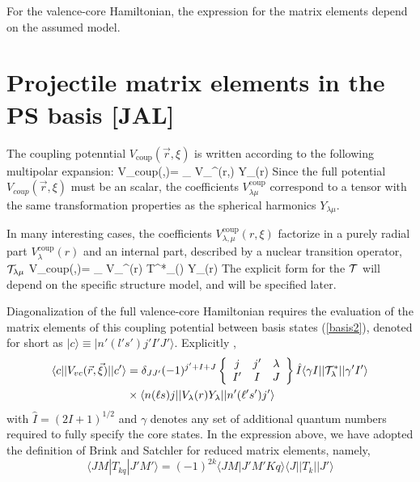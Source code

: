 \documentclass[preprint,12pt]{elsarticle}
\begin{document}
For the valence-core Hamiltonian, the expression for the matrix elements depend on the assumed model.

\section{Projectile matrix elements in the PS basis [JAL]}
The coupling potenntial $V_\mathrm{coup}(\vec{r},\xi)$ 
is written according to the following multipolar expansion:
\be
V_{coup}(,\xi)= \sum_{\lambda } V_{\lambda \mu}^(r,\xi) Y_{\lambda \mu }(\hat r)
\label{vcoup1}
\ee
Since the full potential $V_{coup}(\vec{r},\xi)$ must be an scalar, the coefficients  $V_{\lambda \mu}^\mathrm{coup}$ correspond to a tensor 
with the same transformation properties as the spherical harmonics $Y_{\lambda \mu }$.

In many interesting cases, the coefficients $V_{\lambda,\mu}^\mathrm{coup}(r,\xi)$  factorize in a purely radial part $V^\mathrm{coup}_{\lambda}(r)$ and an internal part, described by a nuclear transition operator, ${\cal T}_{\lambda \mu}$
\be
V_{coup}(,\xi)= \sum_{\lambda } 
     V_{\lambda}^(r) {\cal T}^{*}_{\lambda \mu}(\xi) Y_{\lambda \mu }(\hat r)
\label{vcoup}
\ee
The explicit form for the ${\cal T}$ will depend on the specific structure model, and will be specified later.


Diagonalization of the full valence-core Hamiltonian requires the evaluation of the matrix elements of this coupling potential between basis states (\ref{basis2}), denoted for short as $| c \rangle \equiv  | n' (l's')j' I' J' \rangle$. Explicitly \cite{Tam65},
%
%
\begin{align}
 \langle c || V_{vc}(\vec{r},\vec{\xi}) || c' \rangle  
   & =   
  \delta_{JJ'}(-1)^{j'+I+J} \left\lbrace 
  \begin{array}{ccc} j & j' & \lambda \\ I'& I & J  \end{array} \right\rbrace 
\hat{I} \langle \gamma  I || {\cal T}^{*}_{\lambda}||  \gamma' I' \rangle
 \nonumber \\
 &\times  \langle n (\ell s)j || V_\lambda(r) Y_{\lambda } || n' (\ell' s')j'  \rangle   
 \label{redpot}
\end{align}
%
%
with  $\hat{I}=(2I+1)^{1/2}$ and  $\gamma$ denotes any set of additional quantum numbers required to fully specify the core states. In the expression above, we have adopted the definition of Brink and Satchler \cite{BS} for reduced matrix elements, namely,
\begin{equation}
\langle J M | T_{kq}| J'  M' \rangle
   = (-1)^{2k} \langle  J M | J' M' K q \rangle  \langle J || T_{k}|| J' \rangle
\label{redmat}
\end{equation}
\end{document}
